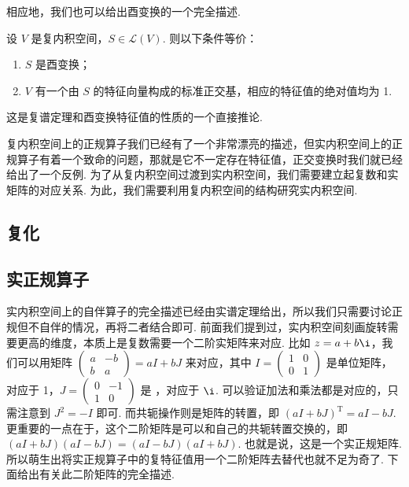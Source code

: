 相应地，我们也可以给出酉变换的一个完全描述.

\begin{theorem}
    设 $ V $ 是复内积空间，$ S \in \mathcal{L}(V) $. 则以下条件等价：
    \begin{enumerate}
        \item $ S $ 是酉变换；

        \item $ V $ 有一个由 $ S $ 的特征向量构成的标准正交基，相应的特征值的绝对值均为 1.
    \end{enumerate}
\end{theorem}

这是复谱定理和酉变换特征值的性质的一个直接推论.

复内积空间上的正规算子我们已经有了一个非常漂亮的描述，但实内积空间上的正规算子有着一个致命的问题，那就是它不一定存在特征值，正交变换时我们就已经给出了一个反例. 为了从复内积空间过渡到实内积空间，我们需要建立起复数和实矩阵的对应关系. 为此，我们需要利用复内积空间的结构研究实内积空间.

\subsection{复化}

\subsection{实正规算子}

实内积空间上的自伴算子的完全描述已经由实谱定理给出，所以我们只需要讨论正规但不自伴的情况，再将二者结合即可. 前面我们提到过，实内积空间刻画旋转需要更高的维度，本质上是复数需要一个二阶实矩阵来对应. 比如 $ z = a + b\i $，我们可以用矩阵 $ \begin{pmatrix} a & -b \\ b & a \end{pmatrix} = aI + bJ $ 来对应，其中 $ I = \begin{pmatrix} 1 & 0 \\ 0 & 1 \end{pmatrix} $ 是单位矩阵，对应于 1，$ J = \begin{pmatrix} 0 & -1 \\ 1 & 0 \end{pmatrix} $ 是 ，对应于 $ \i $. 可以验证加法和乘法都是对应的，只需注意到 $ J^2 = -I $ 即可. 而共轭操作则是矩阵的转置，即 $ (aI + bJ)^{\mathrm{T}} = aI - bJ $. 更重要的一点在于，这个二阶矩阵是可以和自己的共轭转置交换的，即 $ (aI + bJ)(aI - bJ) = (aI - bJ)(aI + bJ) $. 也就是说，这是一个实正规矩阵. 所以萌生出将实正规算子中的复特征值用一个二阶矩阵去替代也就不足为奇了. 下面给出有关此二阶矩阵的完全描述.

